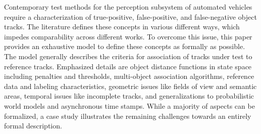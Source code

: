 Contemporary test methods for the perception subsystem of automated vehicles require a characterization of true-positive, false-positive, and false-negative object tracks. %
The literature defines these concepts in various different ways, which impedes comparability across different works. 
To overcome this issue, this paper provides an exhaustive model to define these concepts as formally as possible.
The model generally describes the criteria for association of tracks under test to reference tracks. 
Emphasized details are object distance functions in state space including penalties and thresholds, multi-object association algorithms, reference data and labeling characteristics, geometric issues like fields of view and semantic areas, temporal issues like incomplete tracks, and generalizations to probabilistic world models and asynchronous time stamps. 
While a majority of aspects can be formalized, a case study illustrates the remaining challenges towards an entirely formal description. 



